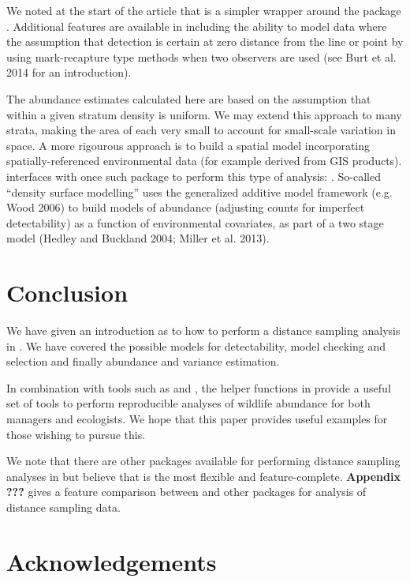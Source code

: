 \documentclass[article]{jss}
\begin{document}
We noted at the start of the article that  is a simpler
wrapper around the package . Additional features are available
in  including the ability to model data where the assumption
that detection is certain at zero distance from the line or point by
using mark-recapture type methods when two observers are used (see Burt
et al. 2014 for an introduction).

The abundance estimates calculated here are based on the assumption that
within a given stratum density is uniform. We may extend this approach
to many strata, making the area of each very small to account for
small-scale variation in space. A more rigourous approach is to build a
spatial model incorporating spatially-referenced environmental data (for
example derived from GIS products).  interfaces with once
such package to perform this type of analysis: . So-called
``density surface modelling'' uses the generalized additive model
framework (e.g. Wood 2006) to build models of abundance (adjusting
counts for imperfect detectability) as a function of environmental
covariates, as part of a two stage model (Hedley and Buckland 2004;
Miller et al. 2013).

\section{Conclusion}\label{conclusion}

We have given an introduction as to how to perform a distance sampling
analysis in . We have covered the possible models for
detectability, model checking and selection and finally abundance and
variance estimation.

In combination with tools such as  and , the
helper functions in  provide a useful set of tools to
perform reproducible analyses of wildlife abundance for both managers
and ecologists. We hope that this paper provides useful examples for
those wishing to pursue this.

We note that there are other packages available for performing distance
sampling analyses in  but believe that  is the
most flexible and feature-complete. \textbf{Appendix ???} gives a
feature comparison between  and other 
packages for analysis of distance sampling data.

\section{Acknowledgements}\label{acknowledgements}
\end{document}
